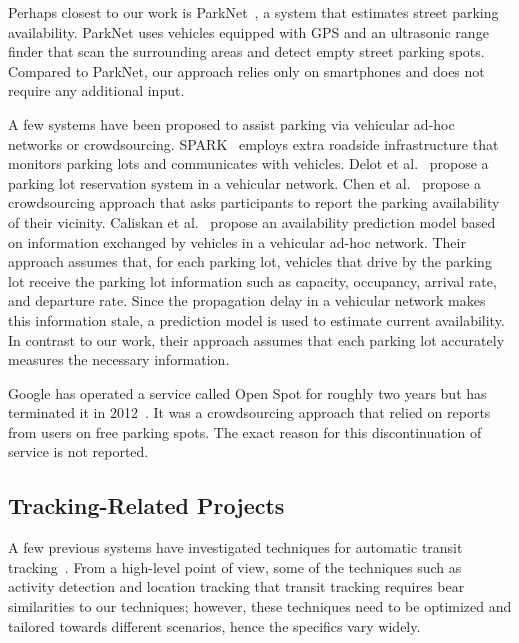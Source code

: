 Perhaps closest to our work is ParkNet~\cite{Mathur:2010:PDS}, a system that
estimates street parking availability. ParkNet uses vehicles equipped with GPS
and an ultrasonic range finder that scan the surrounding areas and detect
empty street parking spots. Compared to ParkNet, our approach relies only on
smartphones and does not require any additional input.

A few systems have been proposed to assist parking via vehicular ad-hoc networks
or crowdsourcing. SPARK~\cite{5062057} employs extra roadside infrastructure
that monitors parking lots and communicates with vehicles. Delot et
al.~\cite{Delot:2009:CRP} propose a parking lot reservation system in a
vehicular network. Chen et al.~\cite{Chen:2012:COS} propose a crowdsourcing
approach that asks participants to report the parking availability of their
vicinity. Caliskan et al.~\cite{4212497} propose an availability
prediction model based on information exchanged by vehicles in a vehicular
ad-hoc network. Their approach assumes that, for each parking lot, vehicles that
drive by the parking lot receive the parking lot information such as capacity,
occupancy, arrival rate, and departure rate. Since the propagation delay in a
vehicular network makes this information stale, a prediction model is used to
estimate current availability. In contrast to our work, their approach assumes
that each parking lot accurately measures the necessary information.

Google has operated a service called Open Spot for roughly two years but has
terminated it in 2012~\cite{open-spot}. It was a crowdsourcing approach that
relied on reports from users on free parking spots. The exact reason for this
discontinuation of service is not reported.

\subsection{Tracking-Related Projects}

A few previous systems have investigated techniques for automatic transit
tracking~\cite{Biagioni:2011:EAT, Thiagarajan:2010:CTT, Zhou:2012:LWP}. From a
high-level point of view, some of the techniques such as activity detection and
location tracking that transit tracking requires bear similarities to
our techniques; however, these techniques need to be optimized and tailored
towards different scenarios, hence the specifics vary widely.

